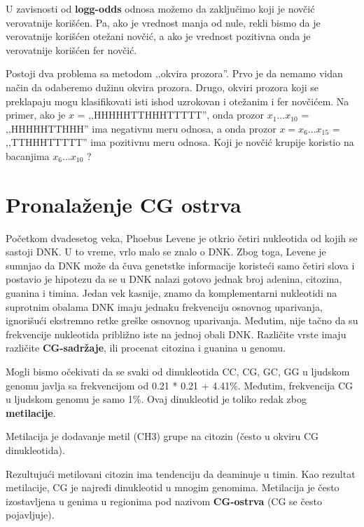 U zavisnosti od \textbf{logg-odds} odnosa možemo da zaključimo koji je novčić verovatnije korišćen. Pa, ako je vrednost manja od nule, rekli bismo da je verovatnije korišćen otežani novčić, a ako je vrednost pozitivna onda je verovatnije korišćen fer novčić. 


Postoji dva problema sa metodom ‚‚okvira prozora''. Prvo je da nemamo vidan način da odaberemo dužinu okvira prozora. Drugo, okviri prozora koji se preklapaju mogu klasifikovati isti ishod uzrokovan i otežanim i fer novčićem. Na primer, ako je $x$ = ‚‚HHHHHTTHHHTTTTT'', onda prozor $x_1...x_{10}$ = ‚‚HHHHHTTHHH'' ima negativnu meru odnosa, a onda prozor $ x = x_6...x_{15}$ = ‚‚TTHHHTTTTT'' ima pozitivnu meru odnosa. Koji je novčić krupije koristio na bacanjima $x_6...x_{10}$ ?


\section{Pronalaženje CG ostrva}

Početkom dvadesetog veka, Phoebus Levene je otkrio četiri nukleotida od kojih se sastoji DNK. U to vreme, vrlo malo se znalo o DNK. Zbog toga, Levene je sumnjao da DNK može da čuva genetstke informacije koristeći samo četiri slova i postavio je hipotezu da se u DNK nalazi gotovo jednak broj adenina, citozina, guanina i timina. Jedan vek kasnije, znamo da komplementarni nukleotidi na suprotnim obalama DNK imaju jednaku frekvenciju osnovnog uparivanja, ignorišući ekstremno retke greške osnovnog uparivanja. Međutim, nije tačno da su frekvencije nukleotida približno iste na jednoj obali DNK. Različite vrste imaju različite \textbf{CG-sadržaje}, ili procenat citozina i guanina u genomu.

Mogli bismo očekivati da se svaki od dinukleotida CC, CG, GC, GG u ljudskom genomu javlja sa frekvencijom od 0.21 * 0.21 + 4.41\%. Međutim, frekvencija CG u ljudskom genomu je samo 1\%. Ovaj dinukleotid je toliko redak zbog \textbf{metilacije}.

\begin{definicija}
	Metilacija je dodavanje metil (CH3) grupe na citozin (često u okviru CG dinukleotida).
\end{definicija}


Rezultujući metilovani citozin ima tendenciju da deaminuje u timin. Kao rezultat metilacije, CG je najređi dinukleotid u mnogim genomima. Metilacija je često izostavljena u genima u regionima pod nazivom \textbf{CG-ostrva} (CG se često pojavljuje). 


